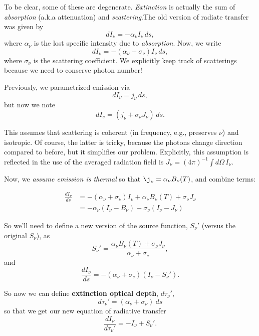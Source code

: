 \documentclass{tufte-handout}
\renewcommand{\textbf}[1]{{\bf \textcolor{dark-gray}{#1}}}
\begin{document}
To be clear, some of these are degenerate. \textit{Extinction} is actually the sum of \textit{absorption} (a.k.a attenuation) and \textit{scattering}.The old version of radiate transfer was given by
\[dI_\nu = -\alpha_\nu I_\nu\, ds,\]
where $\alpha_\nu$ is the lost specific intensity due to \textit{absorption}. Now, we write
\begin{equation}
dI_\nu = -(\alpha_\nu + \sigma_\nu) I_\nu\, ds,
\end{equation}
where $\sigma_\nu$ is the scattering coefficient. We explicitly keep track of scatterings because we need to conserve photon number!

Previously, we parametrized emission via
\[dI_\nu = j_\nu\, ds,\]
but now we note
\begin{equation}
dI_\nu = (j_\nu + \sigma_\nu J_\nu)\, ds.
\end{equation}

This assumes that scattering is coherent (in frequency, e.g., preserves $\nu$) and isotropic. Of course, the latter is tricky, because the photons change direction compared to before, but it simplifies our problem. Explicitly, this assumption is reflected in the use of the averaged radiation field is $J_\nu = (4\pi)^{-1} \int d\Omega \, I_\nu$.

Now, we \textit{assume emission is thermal} so that $\j_\nu = \alpha_\nu B_\nu(T)$, and combine terms:

\begin{align}
\frac{dI_\nu}{ds} &= -(\alpha_\nu+\sigma_\nu) I_\nu + \alpha_\nu B_\nu(T) + \sigma_\nu J_\nu\nonumber\\
&= -\alpha_\nu (I_\nu - B_\nu) - \sigma_\nu(I_\nu - J_\nu)
\end{align}

So we'll need to define a new version of the source function, $S_\nu'$ (versus the original $S_\nu$), as
\begin{equation}
S_\nu' = \frac{\alpha_\nu B_\nu(T) + \sigma_\nu J_\nu}{\alpha_\nu + \sigma_\nu},
\end{equation}
and
\begin{equation}
\frac{dI_\nu}{ds} = -(\alpha_\nu + \sigma_\nu)(I_\nu - S_\nu').
\end{equation}

So now we can define \textbf{extinction optical depth}, $d\tau_\nu'$,
\begin{equation}
d\tau_\nu' = (\alpha_\nu + \sigma_\nu)\ ds
\end{equation}
so that we get our new equation of radiative transfer
\begin{equation}\label{eq:dusty equation of radiative transfer}
\frac{dI_\nu}{d\tau_\nu'} = - I_\nu + S_\nu'.
\end{equation}
\end{document}
